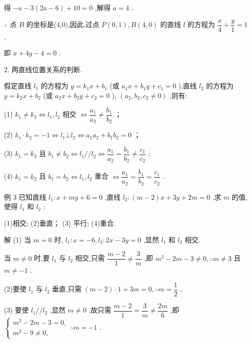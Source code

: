 得 $- a - 3\left( {{2a} - 6}\right)  + {10} = 0$ ,解得 $a = 4$ .

$\therefore$ 点 $B$ 的坐标是(4,0),因此,过点 $P\left( {0,1}\right) ,B\left( {4,0}\right)$ 的直线 $l$ 的方程为 $\dfrac{x}{4} + \dfrac{y}{1} = 1$ ,

即 $x + {4y} - 4 = 0$ .

2. 两直线位置关系的判断.

假定直线 ${l}_{1}$ 的方程为 $y = {k}_{1}x + {b}_{1}$ (或 ${a}_{1}x + {b}_{1}y + {c}_{1} = 0$ ),直线 ${l}_{2}$ 的方程为 $y = {k}_{2}x + {b}_{2}$ (或 ${a}_{2}x + {b}_{2}y + {c}_{2} = 0$ ), $\left( {{a}_{2},{b}_{2},{c}_{2} \neq  0}\right)$ ,则有:

(1) ${k}_{1} \neq  {k}_{2} \Leftrightarrow  {l}_{1},{l}_{2}$ 相交 $\Leftrightarrow  \dfrac{{a}_{1}}{{a}_{2}} \neq  \dfrac{{b}_{1}}{{b}_{2}}$ ；

(2) ${k}_{1} \cdot  {k}_{2} =  - 1 \Leftrightarrow  {l}_{1} \bot  {l}_{2} \Leftrightarrow  {a}_{1}{a}_{2} + {b}_{1}{b}_{2} = 0$ ；

(3) ${k}_{1} = {k}_{2}$ 且 ${b}_{1} \neq  {b}_{2} \Leftrightarrow  {l}_{1}//{l}_{2} \Leftrightarrow  \dfrac{{a}_{1}}{{a}_{2}} = \dfrac{{b}_{1}}{{b}_{2}} \neq  \dfrac{{c}_{1}}{{c}_{2}}$ ;

(4) ${k}_{1} = {k}_{2}$ 且 ${b}_{1} = {b}_{2} \Leftrightarrow  {l}_{1},{l}_{2}$ 重合 $\Leftrightarrow  \dfrac{{a}_{1}}{{a}_{2}} = \dfrac{{b}_{1}}{{b}_{2}} = \dfrac{{c}_{1}}{{c}_{2}}$ .

例 3 已知直线 ${l}_{1} : x + {my} + 6 = 0$ ,直线 ${l}_{2} : \left( {m - 2}\right) x + {3y} + {2m} = 0$ ,求 $m$ 的值,使得 ${l}_{1}$ 和 ${l}_{2}$ :

(1)相交; (2)垂直； (3) 平行; (4)重合.

解 (1) 当 $m = 0$ 时, ${l}_{1} : x =  - 6,{l}_{2} : {2x} - {3y} = 0$ ,显然 ${l}_{1}$ 和 ${l}_{2}$ 相交.

当 $m \neq  0$ 时,要 ${l}_{1}$ 与 ${l}_{2}$ 相交,只需 $\dfrac{m - 2}{1} \neq  \dfrac{3}{m}$ ,即 ${m}^{2} - {2m} - 3 \neq  0,\therefore m \neq  3$ 且 $m \neq   - 1$ .

(2)要使 ${l}_{1}$ 与 ${l}_{2}$ 垂直,只需 $\left( {m - 2}\right)  \cdot  1 + {3m} = 0,\therefore m = \dfrac{1}{2}$ .

(3) 要使 ${l}_{1}//{l}_{2}$ ,显然 $m \neq  0$ ,故只需 $\dfrac{m - 2}{1} = \dfrac{3}{m} \neq  \dfrac{2m}{6}$ ,即 $\left\{  {\begin{array}{l} {m}^{2} - {2m} - 3 = 0, \\  {m}^{2} - 9 \neq  0, \end{array}\therefore m =  - 1}\right.$ .

